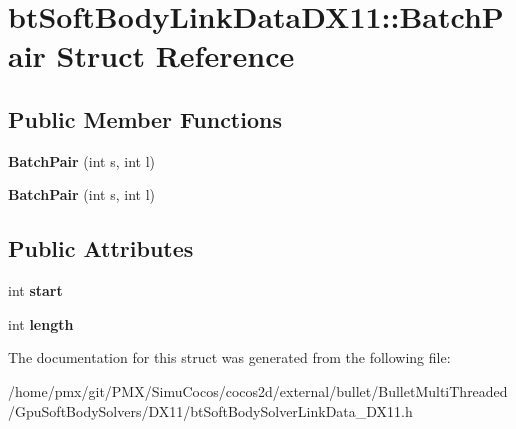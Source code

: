 \hypertarget{structbtSoftBodyLinkDataDX11_1_1BatchPair}{}\section{bt\+Soft\+Body\+Link\+Data\+D\+X11\+:\+:Batch\+Pair Struct Reference}
\label{structbtSoftBodyLinkDataDX11_1_1BatchPair}
\subsection*{Public Member Functions}
\begin{DoxyCompactItemize}
\item 
\mbox{\label{structbtSoftBodyLinkDataDX11_1_1BatchPair_a06180794dcbcbec256416031d7fb94d9}} 
{\bfseries Batch\+Pair} (int s, int l)
\item 
\mbox{\label{structbtSoftBodyLinkDataDX11_1_1BatchPair_a06180794dcbcbec256416031d7fb94d9}} 
{\bfseries Batch\+Pair} (int s, int l)
\end{DoxyCompactItemize}
\subsection*{Public Attributes}
\begin{DoxyCompactItemize}
\item 
\mbox{\label{structbtSoftBodyLinkDataDX11_1_1BatchPair_ab41ae958bbf7b403e5e6ee348c0c8daa}} 
int {\bfseries start}
\item 
\mbox{\label{structbtSoftBodyLinkDataDX11_1_1BatchPair_a33b232eba70f26c9eab3056dd0b0a296}} 
int {\bfseries length}
\end{DoxyCompactItemize}


The documentation for this struct was generated from the following file\+:\begin{DoxyCompactItemize}
\item 
/home/pmx/git/\+P\+M\+X/\+Simu\+Cocos/cocos2d/external/bullet/\+Bullet\+Multi\+Threaded/\+Gpu\+Soft\+Body\+Solvers/\+D\+X11/bt\+Soft\+Body\+Solver\+Link\+Data\+\_\+\+D\+X11.\+h\end{DoxyCompactItemize}
